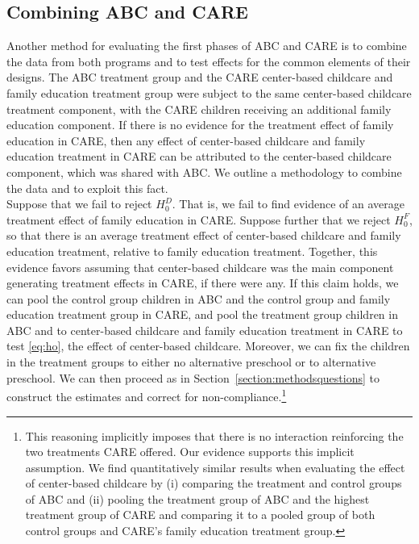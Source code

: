 \subsection{Combining ABC and CARE} \label{section:combine}

\noindent Another method for evaluating the first phases of ABC and CARE is to combine the data from both programs and to test effects for the common elements of their designs. The ABC treatment group and the CARE center-based childcare and family education treatment group were subject to the same center-based childcare treatment component, with the CARE children receiving an additional family education component. If there is no evidence for the treatment effect of family education in CARE, then any effect of center-based childcare and family education treatment in CARE can be attributed to the center-based childcare component, which was shared with ABC. We outline a methodology to combine the data and to exploit this fact.\\

\noindent Suppose that we fail to reject $H_{0}^D$. That is, we fail to find evidence of an average treatment effect of family education in CARE. Suppose further that we reject $H_{0}^F$, so that there is an average treatment effect of center-based childcare and family education treatment, relative to family education treatment. Together, this evidence favors assuming that center-based childcare was the main component generating treatment effects in CARE, if there were any. If this claim holds, we can pool the control group children in ABC and the control group and family education treatment group in CARE, and pool the treatment group children in ABC and to center-based childcare and family education treatment in CARE to test \eqref{eq:ho}, the effect of center-based childcare. Moreover, we can fix the children in the treatment groups to either no alternative preschool or to alternative preschool. We can then proceed as in Section~\ref{section:methodsquestions} to construct the estimates and correct for non-compliance.\footnote{This reasoning implicitly imposes that there is no interaction reinforcing the two treatments CARE offered. Our evidence supports this implicit assumption. We find quantitatively similar results when evaluating the effect of center-based childcare by (i) comparing the treatment and control groups of ABC and (ii) pooling the treatment group of ABC and the highest treatment group of CARE and comparing it to a pooled group of both control groups and CARE's family education treatment group.}\\

